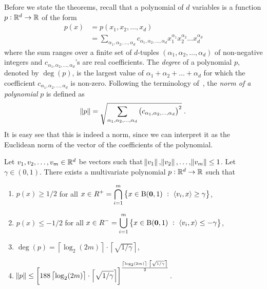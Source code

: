 Before we state the theorems, recall that a polynomial of $d$ variables is a
function $p:\mathbb{R}^d \to \mathbb{R}$ of the form
\begin{align*}
p(x)
&= p(x_1, x_2, \dots, x_d) \\
&= \sum_{\alpha_1, \alpha_2, \dots, \alpha_d} c_{\alpha_1, \alpha_2, \dots, \alpha_d} x_1^{\alpha_1} x_2^{\alpha_2} \dots x_d^{\alpha_d}
\end{align*}
where the sum ranges over a finite set of $d$-tuples $(\alpha_1, \alpha_2,
\dots, \alpha_d)$ of non-negative integers and $c_{\alpha_1, \alpha_2, \dots,
\alpha_d}$'s are real coefficients. The \emph{degree} of a polynomial $p$,
denoted by $\deg(p)$, is the largest value of $\alpha_1 + \alpha_2 + \dots +
\alpha_d$ for which the coefficient $c_{\alpha_1, \alpha_2, \dots, \alpha_d}$ is
non-zero. Following the terminology of~\citet{Klivans-Servedio-2008}, the
\emph{norm of a polynomial} $p$ is defined as
$$
\norm{p} = \sqrt{\sum_{\alpha_1, \alpha_2, \dots, \alpha_d} \left(c_{\alpha_1, \alpha_2, \dots, \alpha_d} \right)^2 } \; .
$$
It is easy see that this is indeed a norm, since we can interpret it as the
Euclidean norm of the vector of the coefficients of the polynomial.

\begin{theorem}
\label{theorem:polynomial-approximation-1}
Let $v_1, v_2, \dots, v_m \in \mathbb{R}^d$ be vectors such that $\norm{v_1},
\norm{v_2}, \dots, \norm{v_m} \le 1$. Let $\gamma \in (0,1)$. There exists a
multivariate polynomial $p:\mathbb{R}^d \to \mathbb{R}$ such that
\begin{enumerate}
\item $p(x) \ge 1/2$ for all $\displaystyle x \in R^+ = \bigcap_{i=1}^m \left\{ x \in \operatorname{B}(\mathbf{0},1) ~:~  \left\langle v_i, x \right\rangle \ge \gamma \right\}$,
\item $p(x) \le -1/2$ for all $\displaystyle x \in R^- = \bigcup_{i=1}^m \left\{ x \in \operatorname{B}(\mathbf{0},1) ~:~  \left\langle v_i, x \right\rangle \le - \gamma \right\}$,
\item $\displaystyle \deg(p) = \left\lceil \log_2(2m) \right\rceil \cdot \left\lceil \sqrt{{1}/{\gamma}} \right\rceil$,
\item $\displaystyle \norm{p} \le \left[ 188 \left\lceil \log_2(2m) \right\rceil \cdot \left\lceil \sqrt{{1}/{\gamma}} \right\rceil \right]^{
  \frac{
    \left\lceil \log_2(2m) \right\rceil \cdot \left\lceil \sqrt{{1}/{\gamma}} \right\rceil
  }{2}
}$.
\end{enumerate}
\end{theorem}

